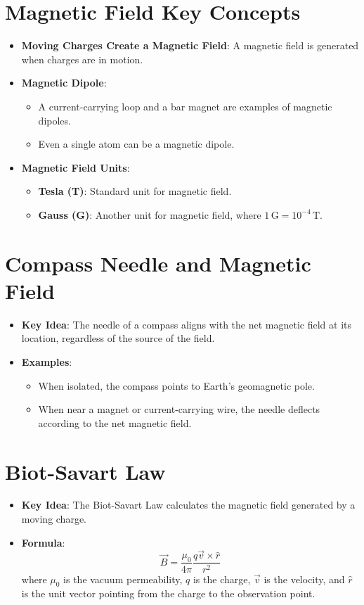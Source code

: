 \documentclass{article}
\begin{document}
\section*{Magnetic Field Key Concepts}
\begin{itemize}
    \item \textbf{Moving Charges Create a Magnetic Field}: A magnetic field is generated when charges are in motion.
    \item \textbf{Magnetic Dipole}:
    \begin{itemize}
        \item A current-carrying loop and a bar magnet are examples of magnetic dipoles.
        \item Even a single atom can be a magnetic dipole.
    \end{itemize}
    \item \textbf{Magnetic Field Units}:
    \begin{itemize}
        \item \textbf{Tesla (T)}: Standard unit for magnetic field.
        \item \textbf{Gauss (G)}: Another unit for magnetic field, where \(1 \, \text{G} = 10^{-4} \, \text{T}\).
    \end{itemize}
\end{itemize}

\section*{Compass Needle and Magnetic Field}
\begin{itemize}
    \item \textbf{Key Idea}: The needle of a compass aligns with the net magnetic field at its location, regardless of the source of the field.
    \item \textbf{Examples}:
    \begin{itemize}
        \item When isolated, the compass points to Earth's geomagnetic pole.
        \item When near a magnet or current-carrying wire, the needle deflects according to the net magnetic field.
    \end{itemize}
\end{itemize}

\section*{Biot-Savart Law}
\begin{itemize}
    \item \textbf{Key Idea}: The Biot-Savart Law calculates the magnetic field generated by a moving charge.
    \item \textbf{Formula}:
    \[
    \vec{B} = \frac{\mu_0}{4\pi} \frac{q \vec{v} \times \hat{r}}{r^2}
    \]
    where \(\mu_0\) is the vacuum permeability, \(q\) is the charge, \(\vec{v}\) is the velocity, and \(\hat{r}\) is the unit vector pointing from the charge to the observation point.
\end{itemize}
\end{document}
